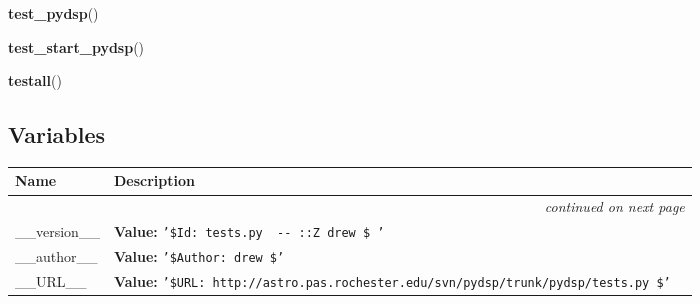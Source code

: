     \vspace{0.5ex}

    \begin{boxedminipage}{\textwidth}

    \raggedright \textbf{test\_pydsp}()

    \end{boxedminipage}

    \label{tests:test_start_pydsp}

    \vspace{0.5ex}

    \begin{boxedminipage}{\textwidth}

    \raggedright \textbf{test\_start\_pydsp}()

    \end{boxedminipage}

    \label{tests:testall}

    \vspace{0.5ex}

    \begin{boxedminipage}{\textwidth}

    \raggedright \textbf{testall}()

    \end{boxedminipage}



  \subsection{Variables}

\begin{longtable}{|p{}|p{}|l}
\cline{1-2}
\cline{1-2} \centering \textbf{Name} & \centering \textbf{Description}& \\
\cline{1-2}
\endhead\cline{1-2}\multicolumn{3}{r}{\small\textit{continued on next page}}\\\endfoot\cline{1-2}
\endlastfoot\raggedright \_\-\_\-v\-e\-r\-s\-i\-o\-n\-\_\-\_\- & \textbf{Value:} 
{\tt '\-\$\-I\-d\-:\-~\-t\-e\-s\-t\-s\-.\-p\-y\-~\-3\-9\-9\-~\-2\-0\-0\-6\--\-0\-6\--\-0\-4\-~\-2\-0\-:\-0\-2\-:\-1\-7\-Z\-~\-d\-r\-e\-w\-~\-\$\-~\-'\-}&\\
\cline{1-2}
\raggedright \_\-\_\-a\-u\-t\-h\-o\-r\-\_\-\_\- & \textbf{Value:} 
{\tt '\-\$\-A\-u\-t\-h\-o\-r\-:\-~\-d\-r\-e\-w\-~\-\$\-'\-}&\\
\cline{1-2}
\raggedright \_\-\_\-U\-R\-L\-\_\-\_\- & \textbf{Value:} 
{\tt '\-\$\-U\-R\-L\-:\-~\-h\-t\-t\-p\-:\-/\-/\-a\-s\-t\-r\-o\-.\-p\-a\-s\-.\-r\-o\-c\-h\-e\-s\-t\-e\-r\-.\-e\-d\-u\-/\-s\-v\-n\-/\-p\-y\-d\-s\-p\-/\-t\-r\-u\-n\-k\-/\-p\-y\-d\-s\-p\-/\-t\-e\-s\-t\-s\-.\-p\-y\-~\-\$\-'\-}&\\
\cline{1-2}
\end{longtable}

